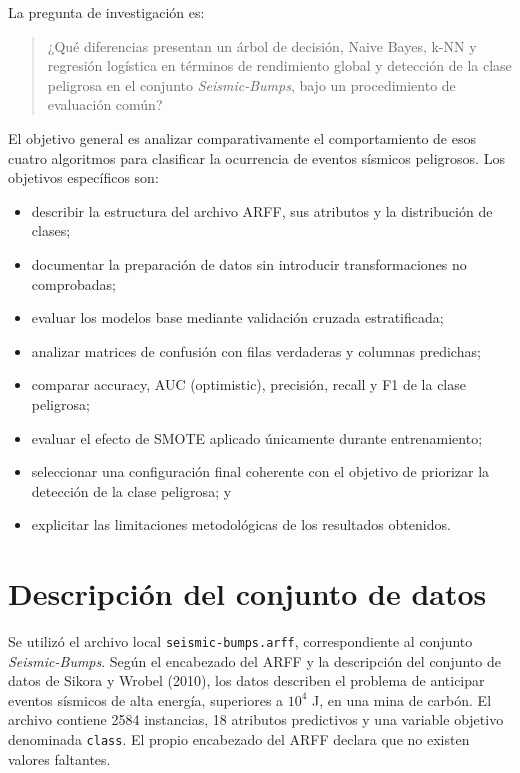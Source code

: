 \documentclass[12pt,a4paper]{article}
\begin{document}
La pregunta de investigación es:
\begin{quote}
¿Qué diferencias presentan un árbol de decisión, Naive Bayes, k-NN y regresión logística en términos de rendimiento global y detección de la clase peligrosa en el conjunto \textit{Seismic-Bumps}, bajo un procedimiento de evaluación común?
\end{quote}

El objetivo general es analizar comparativamente el comportamiento de esos cuatro algoritmos para clasificar la ocurrencia de eventos sísmicos peligrosos. Los objetivos específicos son:
\begin{itemize}
\item describir la estructura del archivo ARFF, sus atributos y la distribución de clases;
\item documentar la preparación de datos sin introducir transformaciones no comprobadas;
\item evaluar los modelos base mediante validación cruzada estratificada;
\item analizar matrices de confusión con filas verdaderas y columnas predichas;
\item comparar accuracy, AUC (optimistic), precisión, recall y F1 de la clase peligrosa;
\item evaluar el efecto de SMOTE aplicado únicamente durante entrenamiento;
\item seleccionar una configuración final coherente con el objetivo de priorizar la detección de la clase peligrosa; y
\item explicitar las limitaciones metodológicas de los resultados obtenidos.
\end{itemize}

\section{Descripción del conjunto de datos}
Se utilizó el archivo local \texttt{seismic-bumps.arff}, correspondiente al conjunto \textit{Seismic-Bumps}. Según el encabezado del ARFF y la descripción del conjunto de datos de Sikora y Wrobel (2010), los datos describen el problema de anticipar eventos sísmicos de alta energía, superiores a $10^4$ J, en una mina de carbón. El archivo contiene 2584 instancias, 18 atributos predictivos y una variable objetivo denominada \texttt{class}. El propio encabezado del ARFF declara que no existen valores faltantes.
\end{document}

